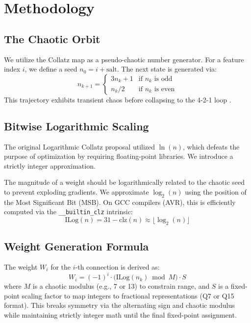 \documentclass[conference]{IEEEtran}
\begin{document}
\section{Methodology}

\subsection{The Chaotic Orbit}
We utilize the Collatz map as a pseudo-chaotic number generator. For a feature index $i$, we define a seed $n_0 = i + \text{salt}$. The next state is generated via:
\begin{equation}
n_{k+1} = 
\begin{cases} 
3n_k + 1 & \text{if } n_k \text{ is odd} \\
n_k / 2 & \text{if } n_k \text{ is even}
\end{cases}
\end{equation}
This trajectory exhibits transient chaos before collapsing to the 4-2-1 loop \cite{lagarias1985collatz}.

\subsection{Bitwise Logarithmic Scaling}
The original Logarithmic Collatz proposal utilized $\ln(n)$, which defeats the purpose of optimization by requiring floating-point libraries. We introduce a strictly integer approximation.

The magnitude of a weight should be logarithmically related to the chaotic seed to prevent exploding gradients. We approximate $\log_2(n)$ using the position of the Most Significant Bit (MSB). On GCC compilers (AVR), this is efficiently computed via the \texttt{\_\_builtin\_clz} intrinsic:
\begin{equation}
\text{ILog}(n) = 31 - \text{clz}(n) \approx \lfloor \log_2(n) \rfloor
\end{equation}

\subsection{Weight Generation Formula}
The weight $W_i$ for the $i$-th connection is derived as:
\begin{equation}
W_i = (-1)^i \cdot \bigl(\text{ILog}(n_k) \bmod M\bigr) \cdot S
\end{equation}
where $M$ is a chaotic modulus (e.g., 7 or 13) to constrain range, and $S$ is a fixed-point scaling factor to map integers to fractional representations (Q7 or Q15 format). This breaks symmetry via the alternating sign and chaotic modulus while maintaining strictly integer math until the final fixed-point assignment.
\end{document}
